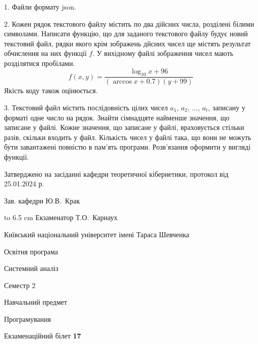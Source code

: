 \documentclass[12pt, ukrainian]{article}
\begin{document}
{%
1. Файли формату json.%
\par
\vspace{2mm}

2. Кожен рядок текстового файлу містить по два дійсних числа, розділені білими символами.
Написати функцію, що для заданого текстового файлу будує новий текстовий файл, рядки якого крім зображень дйсних чисел ще містять результат обчислення на них функції $f$. У вихідному файлі зображення чисел мають розділятися пробілами. 
$$f(x, y) =\frac{\log_{10} x + 96}{(\arccos x + 0.7) (y + 99)}$$ 
Якість коду також оцінюється.

\par
\vspace{2mm}

3. Текстовий файл містить послідовність цілих чисел $a_1$, $a_2$, $\ldots$, $a_t$, записану у форматі одне число на рядок. Знайти сімнадцяте найменше значення, що записане у файлі. Кожне значення, що записане у файлі, враховується стільки разів, скільки входить у файл. Кількість чисел у файлі така, що вони не можуть бути завантажені повністю в пам'ять програми. Розв'язання оформити у вигляді функції.

}
{\smallskip\smallskip \begin {scriptsize} Затверджено на засіданні кафедри теоретичної кібернетики, протокол   від   25.01.2024 р.\par\smallskip\smallskip\smallskip\smallskip
{\parbox {6.5 cm} {Зав. кафедри \dotfill Ю.В.~Крак}}\hspace {0.7cm} {\hbox to 6.5 cm { Екзаменатор \dotfill Т.О.~Карнаух}} \end{scriptsize}}
\newpage
{{\begin {scriptsize}\par
{ \center  Київський національний університет імені Тараса Шевченка \par}
{\parbox {5 cm}{Освітня програма \hfill}{\parbox {7 cm}{Системний аналіз\hfill}}\parbox {6 cm}{\hfill Семестр 2}}\par
{\parbox {5 cm} {Навчальний предмет \hfill}\parbox {7 cm}{Програмування \hfill}\parbox {6cm}{\hfill}\par}\vspace{-15pt} \end{scriptsize}}{\center Екзаменаційний білет \No \textbf { 17 }\par}}
\end{document}
